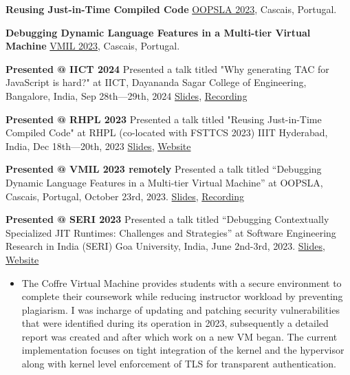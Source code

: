 
\textbf{Reusing Just-in-Time Compiled Code}\newline
\href{https://doi.org/10.1145/3622839}{OOPSLA 2023}, Cascais, Portugal.

\divider

\textbf{Debugging Dynamic Language Features in a Multi-tier Virtual Machine}\newline
\href{https://doi.org/10.1145/3623507.3623549}{VMIL 2023}, Cascais, Portugal.


\textbf{Presented @ IICT 2024}\newline
Presented a talk titled "Why generating TAC for JavaScript is hard?" at IICT, Dayananda Sagar College of Engineering, Bangalore, India, Sep 28th—29th, 2024
\href{https://meetesh06.github.io/IICT-PPT-RC2.pdf}{Slides}, \href{https://www.youtube.com/watch?v=5yYm6mYRiO8}{Recording}

\divider

\textbf{Presented @ RHPL 2023}\newline
Presented a talk titled "Reusing Just-in-Time Compiled Code" at RHPL (co-located with FSTTCS 2023) IIIT Hyderabad, India, Dec 18th—20th, 2023
\href{https://meetesh06.github.io/RHPL-23.pdf}{Slides}, \href{https://fmindia.cmi.ac.in/rhpl/index.html}{Website}

\divider

\textbf{Presented @ VMIL 2023 remotely}\newline
Presented a talk titled “Debugging Dynamic Language Features in a Multi-tier Virtual Machine” at OOPSLA, Cascais, Portugal, October 23rd, 2023.
\href{https://meetesh06.github.io/VMIL-23-talk.pdf}{Slides}, \href{https://www.youtube.com/watch?v=pd_Px8LaHvw&t=20041s}{Recording}

\divider

\textbf{Presented @ SERI 2023}\newline
Presented a talk titled “Debugging Contextually Specialized JIT Runtimes: Challenges and Strategies” at Software Engineering Research in India (SERI) Goa University, India, June 2nd-3rd, 2023.
\href{https://meetesh06.github.io/seri-23-talk.pdf}{Slides}, \href{https://sites.google.com/view/seri-2023-goa/talks?authuser=0}{Website}


\begin{itemize}
\item The Coffre Virtual Machine provides students with a secure environment to complete their coursework while reducing instructor workload by preventing plagiarism. I was incharge of updating and patching security vulnerabilities that were identified during its operation in 2023, subsequently a detailed report was created and after which work on a new VM began. The current implementation focuses on tight integration of the kernel and the hypervisor along with kernel level enforcement of TLS for transparent authentication.
\end{itemize}


